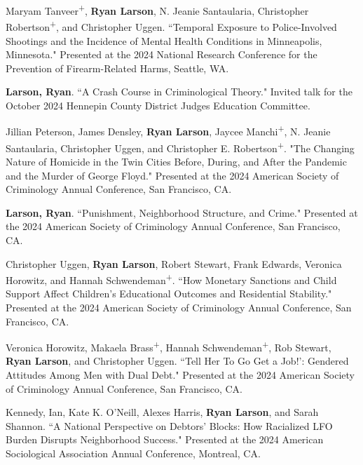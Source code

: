\documentclass[letterpaper]{article}
\newenvironment{publist}{%
  \begin{list}{}{%
    \setlength{\leftmargin}{0cm}   %
    \setlength{\labelwidth}{2cm}     %
    \setlength{\labelsep}{0.5cm}     %
  }%
}{%
  \end{list}%
}
\begin{document}
\begin{publist}
\item[\textbf{2024}] Maryam Tanveer\textsuperscript{+}, \textbf{Ryan Larson}, N. Jeanie Santaularia, Christopher Robertson\textsuperscript{+}, and Christopher Uggen. ``Temporal Exposure to Police-Involved Shootings and the Incidence of Mental Health Conditions in Minneapolis, Minnesota." Presented at the 2024 National Research Conference for the Prevention of Firearm-Related Harms, Seattle, WA. 

\item \textbf{Larson, Ryan}. ``A Crash Course in Criminological Theory." Invited talk for the October 2024 Hennepin County District Judges Education Committee.  

\item Jillian Peterson, James Densley, \textbf{Ryan Larson}, Jaycee Manchi\textsuperscript{+}, N. Jeanie Santaularia, Christopher Uggen, and Christopher E. Robertson\textsuperscript{+}. "The Changing Nature of Homicide in the Twin Cities Before, During, and After the Pandemic and the Murder of George Floyd." Presented at the 2024 American Society of Criminology Annual Conference, San Francisco, CA. 

\item \textbf{Larson, Ryan}. ``Punishment, Neighborhood Structure, and Crime." Presented at the 2024 American Society of Criminology Annual Conference, San Francisco, CA. 

\item Christopher Uggen, \textbf{Ryan Larson}, Robert Stewart, Frank Edwards, Veronica Horowitz, and Hannah Schwendeman\textsuperscript{+}. ``How Monetary Sanctions and Child Support Affect Children's Educational Outcomes and Residential Stability." Presented at the 2024 American Society of Criminology Annual Conference, San Francisco, CA. 

\item Veronica Horowitz, Makaela Brass\textsuperscript{+}, Hannah Schwendeman\textsuperscript{+}, Rob Stewart, \textbf{Ryan Larson}, and Christopher Uggen. ``Tell Her To Go Get a Job!': Gendered Attitudes Among Men with Dual Debt." Presented at the 2024 American Society of Criminology Annual Conference, San Francisco, CA. 

\item Kennedy, Ian, Kate K. O’Neill, Alexes Harris, \textbf{Ryan Larson}, and Sarah Shannon. ``A National Perspective on Debtors’ Blocks: How Racialized LFO Burden Disrupts Neighborhood Success." Presented at the 2024 American Sociological Association Annual Conference, Montreal, CA. 


\end{publist}
\end{document}
